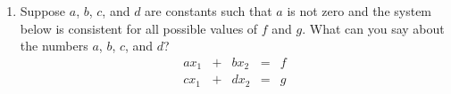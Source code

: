 \documentclass[12pt]{article}
\begin{document}
\begin{multicols*}{2}
\begin{enumerate}
		\item Suppose $a$, $b$, $c$, and $d$ are constants such that $a$ is not zero and the system below is consistent for all possible values of $f$ and $g$. What can you say about the numbers $a$, $b$, $c$, and $d$?
		\[
		\begin{array}{ccccc}
			ax_1 &+&bx_2&=&f\\
			cx_1&+&dx_2&=&g
		\end{array}
		\]
		\vfill
	\end{enumerate}
\end{multicols*}
\end{document}
